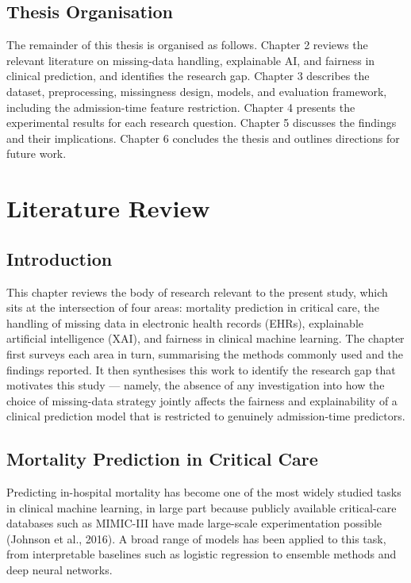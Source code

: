 \documentclass[12pt,a4paper]{report}
\begin{document}
\section{Thesis Organisation}
The remainder of this thesis is organised as follows. Chapter 2 reviews the relevant literature on missing-data handling, explainable AI, and fairness in clinical prediction, and identifies the research gap. Chapter 3 describes the dataset, preprocessing, missingness design, models, and evaluation framework, including the admission-time feature restriction. Chapter 4 presents the experimental results for each research question. Chapter 5 discusses the findings and their implications. Chapter 6 concludes the thesis and outlines directions for future work.


\chapter{Literature Review}

\section{Introduction}
This chapter reviews the body of research relevant to the present study, which sits at the intersection of four areas: mortality prediction in critical care, the handling of missing data in electronic health records (EHRs), explainable artificial intelligence (XAI), and fairness in clinical machine learning. The chapter first surveys each area in turn, summarising the methods commonly used and the findings reported. It then synthesises this work to identify the research gap that motivates this study --- namely, the absence of any investigation into how the choice of missing-data strategy jointly affects the fairness and explainability of a clinical prediction model that is restricted to genuinely admission-time predictors.


\section{Mortality Prediction in Critical Care}
Predicting in-hospital mortality has become one of the most widely studied tasks in clinical machine learning, in large part because publicly available critical-care databases such as MIMIC-III have made large-scale experimentation possible (Johnson et al., 2016). A broad range of models has been applied to this task, from interpretable baselines such as logistic regression to ensemble methods and deep neural networks.
\end{document}
